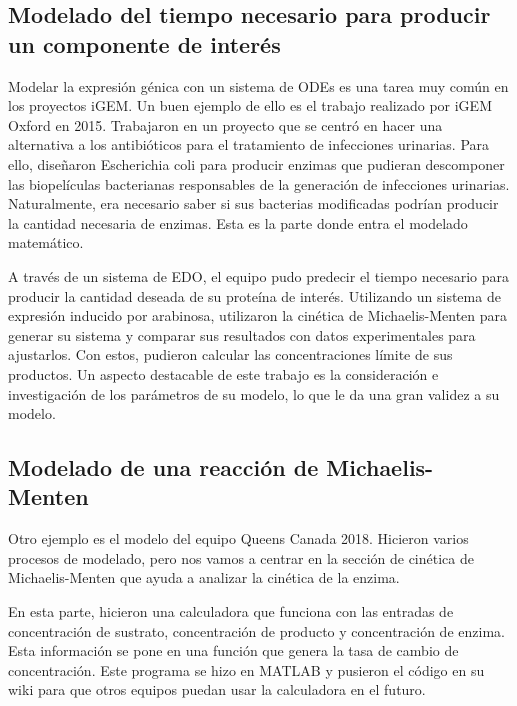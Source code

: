 \documentclass[11pt, letterpaper, spanish]{article}
\begin{document}
{{    \subsection{Modelado del tiempo necesario para producir un componente de interés}
    
\par{Modelar la expresión génica con un sistema de ODEs es una tarea muy común en los proyectos iGEM. Un buen ejemplo de ello
es el trabajo realizado por iGEM Oxford en 2015. Trabajaron en un proyecto que se centró en hacer una alternativa a los antibióticos
para el tratamiento de infecciones urinarias. Para ello, diseñaron Escherichia coli para producir enzimas que pudieran descomponer
las biopelículas bacterianas responsables de la generación de infecciones urinarias. Naturalmente, era necesario saber si sus
bacterias modificadas podrían producir la cantidad necesaria de enzimas. Esta es la parte donde entra el modelado matemático.}

\par{A través de un sistema de EDO, el equipo pudo predecir el tiempo necesario para producir la cantidad deseada de su proteína de interés. Utilizando un sistema de expresión inducido por arabinosa, utilizaron la cinética de Michaelis-Menten para generar su sistema y comparar sus resultados con datos experimentales para ajustarlos. Con estos, pudieron calcular las concentraciones límite de sus productos. Un aspecto destacable de este trabajo es la consideración e investigación de los parámetros de su modelo, lo que le da una gran validez a su modelo.}

    \subsection{Modelado de una reacción de Michaelis-Menten}
\par{Otro ejemplo es el modelo del equipo Queens Canada 2018. Hicieron varios procesos de modelado, pero nos vamos a centrar en
la sección de cinética de Michaelis-Menten que ayuda a analizar la cinética de la enzima.}

\par{En esta parte, hicieron una calculadora que funciona con las entradas de concentración de sustrato, concentración de producto
y concentración de enzima. Esta información se pone en una función que genera la tasa de cambio de concentración. Este
programa se hizo en MATLAB y pusieron el código en su wiki para que otros equipos puedan usar la calculadora en el futuro.}

}}
\end{document}
